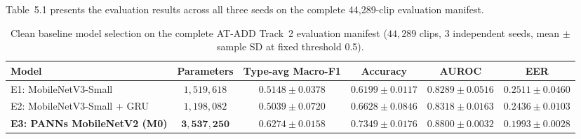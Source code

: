 \documentclass[12pt,a4paper]{report}
\begin{document}
Table~5.1 presents the evaluation results across all three seeds on the complete 44{,}289-clip evaluation manifest.

\begin{table}[htbp]
\centering
\caption{Clean baseline model selection on the complete AT-ADD Track~2 evaluation manifest ($44{,}289$ clips, 3 independent seeds, mean $\pm$ sample SD at fixed threshold 0.5).}
\label{tab:baseline-architecture-atadd}
\small

\begin{tabular}{@{}lccccc@{}}
\toprule
Model & Parameters & Type-avg Macro-F1 & Accuracy & AUROC & EER \\
\midrule
E1: MobileNetV3-Small & $1{,}519{,}618$ & $0.5148 \pm 0.0378$ & $0.6199 \pm 0.0117$ & $0.8289 \pm 0.0516$ & $0.2511 \pm 0.0460$ \\
E2: MobileNetV3-Small + GRU & $1{,}198{,}082$ & $0.5039 \pm 0.0720$ & $0.6628 \pm 0.0846$ & $0.8318 \pm 0.0163$ & $0.2436 \pm 0.0103$ \\
\textbf{E3: PANNs MobileNetV2 (M0)} & $\mathbf{3{,}537{,}250}$ & $\mathbf{0.6274 \pm 0.0158}$ & $\mathbf{0.7349 \pm 0.0176}$ & $\mathbf{0.8800 \pm 0.0032}$ & $\mathbf{0.1993 \pm 0.0028}$ \\
\bottomrule
\end{tabular}

\end{table}
\end{document}
